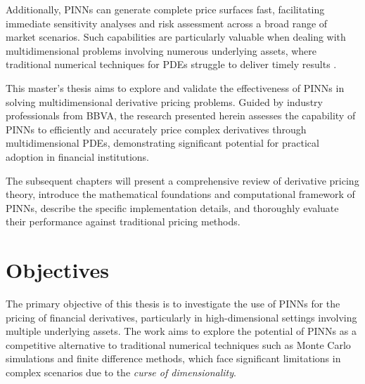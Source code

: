 \documentclass[12pt]{report} %
\theoremstyle{plain}           %
\theoremstyle{definition}      %
\theoremstyle{remark}          %
\begin{document}
Additionally, PINNs can generate complete price surfaces fast, facilitating immediate 
sensitivity analyses and risk assessment across a broad range of market scenarios. Such 
capabilities are particularly valuable when dealing with multidimensional problems involving 
numerous underlying assets, where traditional numerical techniques for PDEs struggle to 
deliver timely results \cite{Wilmott2010PaulWO}.

This master's thesis aims to explore and validate the effectiveness of PINNs in solving 
multidimensional derivative pricing problems. Guided by industry professionals from BBVA, 
the research presented herein assesses the capability of PINNs to efficiently and accurately 
price complex derivatives through multidimensional PDEs, demonstrating significant potential 
for practical adoption in financial institutions.

The subsequent chapters will present a comprehensive review of derivative pricing theory, 
introduce the mathematical foundations and computational framework of PINNs, describe the 
specific implementation details, and thoroughly evaluate their performance against traditional pricing methods.

\section{Objectives}

The primary objective of this thesis is to investigate the use of PINNs for the pricing of financial 
derivatives, particularly in high-dimensional settings involving multiple underlying assets. 
The work aims to explore the potential of PINNs as a competitive alternative to traditional 
numerical techniques such as Monte Carlo simulations and finite difference methods, which face 
significant limitations in complex scenarios due to the \textit{curse of dimensionality}.
\end{document}
